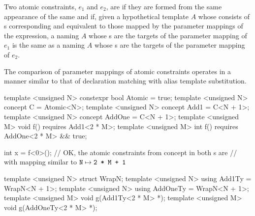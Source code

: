 \documentclass{wg21}
\begin{document}
\pnum
Two atomic constraints, $e_1$ and $e_2$, are
%
if they are formed from the same appearance of the same
and if, given a hypothetical template $A$
whose  consists of
s corresponding and equivalent to
those mapped by the parameter mappings of the expression,
a  naming $A$
whose s are
the targets of the parameter mapping of $e_1$
is the same as
a  naming $A$
whose s are
the targets of the parameter mapping of $e_2$.
\begin{note}
    The comparison of parameter mappings of atomic constraints
    operates in a manner similar to that of declaration matching
    with alias template substitution.
    \begin{example}
        \begin{codeblock}
            template <unsigned N> constexpr bool Atomic = true;
            template <unsigned N> concept C = Atomic<N>;
            template <unsigned N> concept Add1 = C<N + 1>;
            template <unsigned N> concept AddOne = C<N + 1>;
            template <unsigned M> void f()
            requires Add1<2 * M>;
            template <unsigned M> int f()
            requires AddOne<2 * M> && true;

            int x = f<0>();     // OK, the atomic constraints from concept  in both s are 
            // with mapping similar to $\texttt{N} \mapsto \texttt{2 * M + 1}$

            template <unsigned N> struct WrapN;
            template <unsigned N> using Add1Ty = WrapN<N + 1>;
            template <unsigned N> using AddOneTy = WrapN<N + 1>;
            template <unsigned M> void g(Add1Ty<2 * M> *);
            template <unsigned M> void g(AddOneTy<2 * M> *);


\end{codeblock}
\end{example}
\end{note}
\end{document}
